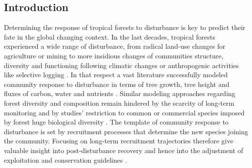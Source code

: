 \documentclass[
  11pt,
  french,
  A4paper,
  extrafontsizes,onecolumn,openright
  ]{memoir}
\begin{document}
\subsection{Introduction}\label{introduction-2}

Determining the response of tropical forests to disturbance is key to
predict their fate in the global changing context. In the last decades,
tropical forests experienced a wide range of disturbance, from radical
land-use changes for agriculture or mining
\autocites{Dezecache2017a}{Dezecache2017b} to more insidious changes of
communities structure, diversity and functioning following climatic
changes \autocite{Aubry-Kientz2015} or anthropogenic activities like
selective logging \autocite{Baraloto2012}. In that respect a vast
literature successfully modeled community response to disturbance in
terms of tree growth, tree height and fluxes of carbon, water and
nutrients
\autocites{Gourlet-Fleury2000}{Putz2012}{Piponiot2016}{Rutishauser2016}.
Similar modeling approaches regarding forest diversity and composition
remain hindered by the scarcity of long-term monitoring and by studies'
restriction to common or commercial species imposed by forest huge
biological diversity \autocites{Sebbenn2008}{Vinson2015}. The template
of community response to disturbance is set by recruitment processes
that determine the new species joining the community. Focusing on
long-term recruitment trajectories therefore give valuable insight into
post-disturbance recovery and hence into the adjustment of exploitation
and conservation guidelines \autocites{Diaz2005}{Schwartz2017}.
\end{document}
